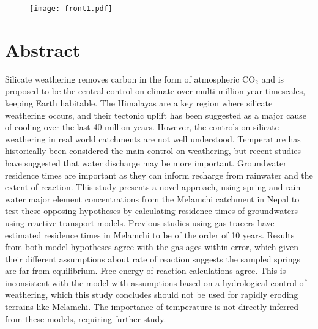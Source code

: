 \documentclass[hidelinks, 12pt]{article} %
\title{
  \vspace{-1cm}
  {\fontsize{16pt}{18pt}\selectfont
    \textbf{
      \strut Ground Truthing Earth's Silicate Weathering Thermostat:\\[0.4em] %
      \strut Using the Geochemistry of Himalayan Groundwaters to \\[-0.2em]
      \strut Calculate Residence Times
    }
  }
  \vspace{0.5cm}
}
\author{Giovanni Bernardi\\ 
Part III Project}
\date{2024-2025}
\begin{document}

\maketitle

\begingroup
\renewcommand{\thefigure}{} %
\begin{figure}[h]
  \centering
      \texttt{[image: front1.pdf]}
\end{figure}
\endgroup


\thispagestyle{empty}

\newpage

\section*{Abstract}
\label{sec:abstract}


Silicate weathering removes carbon in the form of atmospheric CO$_2$ and is proposed to be the central control on climate over multi-million year timescales, keeping Earth habitable. The Himalayas are a key region where silicate weathering occurs, and their tectonic uplift has been suggested as a major cause of cooling over the last 40 million years. However, the controls on silicate weathering in real world catchments are not well understood. Temperature has historically been considered the main control on weathering, but recent studies have suggested that water discharge may be more important. Groundwater residence times are important as they can inform recharge from rainwater and the extent of reaction. This study presents a novel approach, using spring and rain water major element concentrations from the Melamchi catchment in Nepal to test these opposing hypotheses by calculating residence times of groundwaters using reactive transport models. Previous studies using gas tracers have estimated residence times in Melamchi to be of the order of 10 years. Results from both model hypotheses agree with the gas ages within error, which given their different assumptions about rate of reaction suggests the sampled springs are far from equilibrium. Free energy of reaction calculations agree. This is inconsistent with the model with assumptions based on a hydrological control of weathering, which this study concludes should not be used for rapidly eroding terrains like Melamchi. The importance of temperature is not directly inferred from these models, requiring further study.
\end{document}

